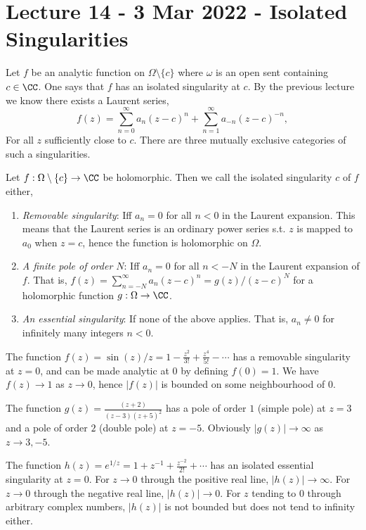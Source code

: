 \section{Lecture 14 - 3 Mar 2022 - Isolated Singularities}
Let $f$ be an analytic function on $\Omega\setminus\{c\}$ where $\omega$ is an
open sent containing $c\in\CC$. One says that $f$ has an isolated singularity at
$c$. By the previous lecture we know there exists a Laurent series,
\[f(z)= \sum_{n=0}^{\infty} a_n(z-c)^n + \sum_{n=1}^{\infty}
a_{-n}(z-c)^{-n},\]
For all $z$ sufficiently close to $c$. There are three mutually exclusive
categories of such a singularities.
\begin{definition}
  Let $f:\Omega\setminus\{c\}\to\CC$ be holomorphic. Then we call the isolated
  singularity $c$ of $f$ either,
  \begin{enumerate}
    \item \emph{Removable singularity}: Iff $a_n=0$ for all $n<0$ in the Laurent
      expansion. This means that the Laurent series is an ordinary power series
      s.t. $z$ is mapped to $a_0$ when $z=c$, hence the function is holomorphic
      on $\Omega$.
    \item \emph{A finite pole of order $N$}: Iff $a_n=0$ for all $n<-N$ in the
      Laurent expansion of $f$. That is, $f(z)= \sum_{n=-N}^{\infty} a_n(z-c)^n
      = g(z)/(z-c)^N$ for a holomorphic function $g:\Omega\to\CC$.
    \item \emph{ An essential singularity}: If none of the above applies. That
      is, $a_n\neq 0$ for infinitely many integers $n<0$.
  \end{enumerate}
  \label{def:isolatedSingularitiesClass}
\end{definition}
\begin{example}
  The function $f(z)=\sin(z)/z = 1-\frac{z^2}{3!} + \frac{z^4}{5!}-\cdots$ has a
  removable singularity at $z=0$, and can be made analytic at $0$ by defining
  $f(0)=1$. We have $f(z)\to 1$ as $z\to 0$, hence $|f(z)|$ is bounded on some
  neighbourhood of $0$.
\end{example}
\begin{example}
  The function $g(z)= \frac{(z+2)}{(z-3) (z+5)^2}$ has a pole of order $1$
  (simple pole) at $z=3$ and a pole of order $2$ (double pole) at $z=-5$.
  Obviously $|g(z)|\to\infty$ as $z\to 3, -5$.
\end{example}
\begin{example}
  The function $h(z)=e^{1/z}= 1+ z^{-1}+\frac{z^{-2}}{2!}+\cdots$ has an
  isolated essential singularity at $z=0$. For $z\to 0$ through the positive
  real line, $|h(z)|\to \infty$. For $z\to 0$ through the negative real line,
  $|h(z)|\to 0$. For $z$ tending to $0$ through arbitrary complex numbers,
  $|h(z)|$ is not bounded but does not tend to infinity either.
\end{example}

